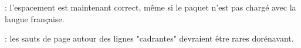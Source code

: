 \begin{tdocfix}
	\item {}: l'espacement est maintenant correct, même si le paquet  n'est pas chargé avec la langue française.

	\item {}: les sauts de page autour des lignes "cadrantes" devraient être rares dorénavant.
\end{tdocfix}
